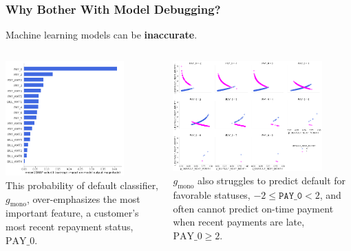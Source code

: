 \documentclass[11pt,
               aspectratio=43,
               hyperref={colorlinks}
               ]{beamer}
\begin{document}
	\begin{frame}
		
		\frametitle{Why Bother With Model Debugging?}
		
			\footnotesize{Machine learning models can be \textbf{inaccurate}.}
			\begin{columns}
				
				\centering
				\includegraphics[height=125pt]{img/global_shap.png}\\
				\vspace{5pt}
				\tiny{This probability of default classifier, $g_{\text{mono}}$, over-emphasizes the most important feature, a customer's most recent repayment status, $\text{PAY\_0}$.}
				
				\centering
				\vspace{9pt}
				\includegraphics[height=120pt]{img/resid.png}\\
				\vspace{8pt}
				\tiny{$g_{\text{mono}}$ also struggles to predict default for favorable statuses, $-2  \leq \texttt{PAY\_0}  < 2$, and often cannot predict on-time payment when recent payments are late, $\text{PAY\_0} \geq 2$}.
				
			\end{columns}
			\normalsize
			
	\end{frame}
	
\end{document}

